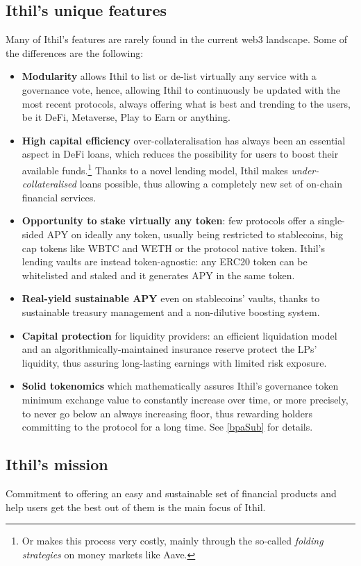 \documentclass[a4paper,10 pt]{article}
\theoremstyle{definition}
\begin{document}
\subsection{Ithil's unique features}
Many of Ithil's features are rarely found in the current web3 landscape. Some of the differences are the following:
\begin{itemize}
\item {\bf Modularity} allows Ithil to list or de-list virtually any service with a governance vote, hence, allowing Ithil to continuously be updated with the most recent protocols, always offering what is best and trending to the users, be it DeFi, Metaverse, Play to Earn or anything.
\item {\bf High capital efficiency} over-collateralisation has always been an essential aspect in DeFi loans, which reduces the possibility for users to boost their available funds.\footnote{Or makes this process very costly, mainly through the so-called {\it folding strategies} on money markets like Aave.} Thanks to a novel lending model, Ithil makes {\it under-collateralised} loans possible, thus allowing a completely new set of on-chain financial services.
\item {\bf Opportunity to stake virtually any token}: few protocols offer a single-sided APY on ideally any token, usually being restricted to stablecoins, big cap tokens like WBTC and WETH or the protocol native token. Ithil's lending vaults are instead token-agnostic: any ERC20 token can be whitelisted and staked and it generates APY in the same token.
\item {\bf Real-yield sustainable APY} even on stablecoins' vaults, thanks to sustainable treasury management and a non-dilutive boosting system.
\item {\bf Capital protection} for liquidity providers: an efficient liquidation model and an algorithmically-maintained insurance reserve protect the LPs' liquidity, thus assuring long-lasting earnings with limited risk exposure.
\item {\bf Solid tokenomics} which mathematically assures Ithil's governance token minimum exchange value to constantly increase over time, or more precisely, to never go below an always increasing floor, thus rewarding holders committing to the protocol for a long time. See \ref{bpaSub} for details. 
\end{itemize}

\subsection{Ithil's mission}
Commitment to offering an easy and sustainable set of financial products and help users get the best out of them is the main focus of Ithil.
\end{document}
